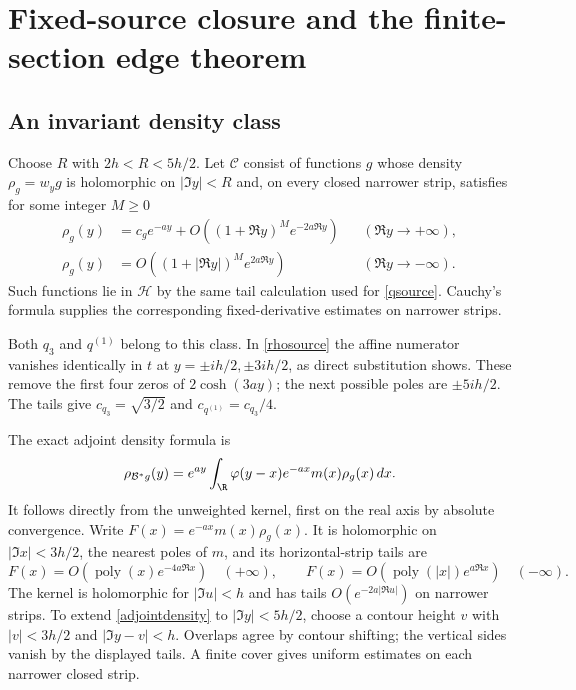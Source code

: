 \section{Fixed-source closure and the finite-section edge theorem}\label{sec:edge}
\subsection{An invariant density class}
Choose $R$ with $2h<R<5h/2$. Let $\mathcal C$ consist of functions
$g$ whose density $\rho_g=w_yg$ is holomorphic on $|\Im y|<R$ and,
on every closed narrower strip, satisfies for some integer $M\ge0$
\begin{align}
 \rho_g(y)&=c_ge^{-ay}+O((1+\Re y)^Me^{-2a\Re y})
                                  &&(\Re y\to+\infty),\label{densityclass}\\
 \rho_g(y)&=O((1+|\Re y|)^Me^{2a\Re y})
                                  &&(\Re y\to-\infty).\nonumber
\end{align}
Such functions lie in $\mathcal H$ by the same tail calculation
used for \eqref{qsource}. Cauchy's formula supplies the corresponding
fixed-derivative estimates on narrower strips.

Both $q_3$ and $q^{(1)}$ belong to this class. In
\eqref{rhosource} the affine numerator vanishes identically in $t$
at $y=\pm ih/2,\pm3ih/2$, as direct substitution shows. These
remove the first four zeros of $2\cosh(3ay)$; the next possible
poles are $\pm5ih/2$. The tails give
$c_{q_3}=\sqrt{3/2}$ and $c_{q^{(1)}}=c_{q_3}/4$.

The exact adjoint density formula is
\begin{equation}\label{adjointdensity}
 \rho_{\mathcal B^*g}(y)
   =e^{ay}\int_\R\varphi(y-x)e^{-ax}m(x)\rho_g(x)\,dx.
\end{equation}
It follows directly from the unweighted kernel, first on the real
axis by absolute convergence. Write $F(x)=e^{-ax}m(x)\rho_g(x)$.
It is holomorphic on $|\Im x|<3h/2$, the nearest poles of $m$,
and its horizontal-strip tails are
\[
 F(x)=O(\operatorname{poly}(x)e^{-4a\Re x})\quad(+\infty),\qquad
 F(x)=O(\operatorname{poly}(|x|)e^{a\Re x})\quad(-\infty).
\]
The kernel is holomorphic for $|\Im u|<h$ and has tails
$O(e^{-2a|\Re u|})$ on narrower strips. To extend
\eqref{adjointdensity} to $|\Im y|<5h/2$, choose a contour height
$v$ with $|v|<3h/2$ and $|\Im y-v|<h$. Overlaps agree by contour
shifting; the vertical sides vanish by the displayed tails.
A finite cover gives uniform estimates on each narrower closed strip.

